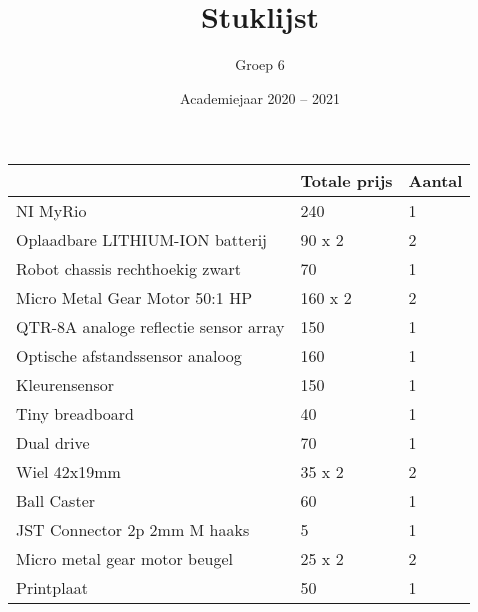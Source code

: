 \documentclass[a4paper,kulak]{kulakarticle} %
\date{Academiejaar 2020 -- 2021}
\title{Stuklijst}
\author{Groep 6}
\begin{document}
\maketitle

\begin{center}
	\begin{tabular}{|l|l|l|}
		\hline
		 & Totale prijs & Aantal \\ \hline
		 NI MyRio & 240 & 1 \\ \hline
		 Oplaadbare LITHIUM-ION batterij & 90 x 2 & 2 \\ \hline
		 Robot chassis rechthoekig zwart & 70 & 1 \\ \hline
		 Micro Metal Gear Motor 50:1 HP & 160 x 2 & 2 \\ \hline
		 QTR-8A analoge reflectie sensor array & 150 & 1 \\ \hline
		 Optische afstandssensor analoog & 160 & 1 \\ \hline 
		 Kleurensensor & 150 & 1 \\ \hline
		 Tiny breadboard & 40 & 1 \\ \hline
		 Dual drive & 70 & 1 \\ \hline 
		 Wiel 42x19mm & 35 x 2 & 2 \\ \hline
		 Ball Caster & 60 & 1 \\ \hline
		 JST Connector 2p 2mm M haaks & 5 & 1 \\ \hline
		 Micro metal gear motor beugel
& 25 x 2 & 2 \\ \hline
		 Printplaat & 50 & 1 \\ \hline
		    
		
		
	\end{tabular}
\end{center}
\end{document}
